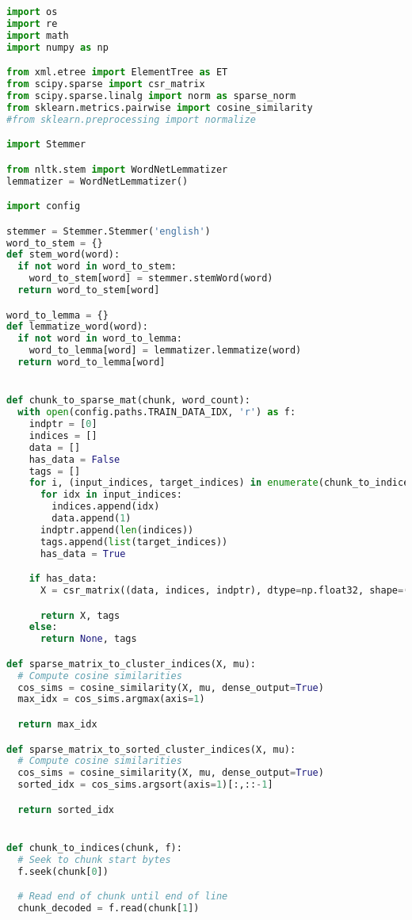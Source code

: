 \begin{lstlisting}[language=python]
import os
import re
import math
import numpy as np

from xml.etree import ElementTree as ET
from scipy.sparse import csr_matrix
from scipy.sparse.linalg import norm as sparse_norm
from sklearn.metrics.pairwise import cosine_similarity
#from sklearn.preprocessing import normalize

import Stemmer

from nltk.stem import WordNetLemmatizer
lemmatizer = WordNetLemmatizer()

import config

stemmer = Stemmer.Stemmer('english')
word_to_stem = {}
def stem_word(word):
  if not word in word_to_stem:
    word_to_stem[word] = stemmer.stemWord(word)
  return word_to_stem[word]

word_to_lemma = {}
def lemmatize_word(word):
  if not word in word_to_lemma:
    word_to_lemma[word] = lemmatizer.lemmatize(word)
  return word_to_lemma[word]


def chunk_to_sparse_mat(chunk, word_count):
  with open(config.paths.TRAIN_DATA_IDX, 'r') as f:
    indptr = [0]
    indices = []
    data = []
    has_data = False
    tags = []
    for i, (input_indices, target_indices) in enumerate(chunk_to_indices(chunk, f)):
      for idx in input_indices:
        indices.append(idx)
        data.append(1)
      indptr.append(len(indices))
      tags.append(list(target_indices))
      has_data = True

    if has_data:
      X = csr_matrix((data, indices, indptr), dtype=np.float32, shape=(len(indptr) - 1, word_count))

      return X, tags
    else:
      return None, tags

def sparse_matrix_to_cluster_indices(X, mu):
  # Compute cosine similarities
  cos_sims = cosine_similarity(X, mu, dense_output=True)
  max_idx = cos_sims.argmax(axis=1)

  return max_idx

def sparse_matrix_to_sorted_cluster_indices(X, mu):
  # Compute cosine similarities
  cos_sims = cosine_similarity(X, mu, dense_output=True)
  sorted_idx = cos_sims.argsort(axis=1)[:,::-1]

  return sorted_idx


def chunk_to_indices(chunk, f):
  # Seek to chunk start bytes
  f.seek(chunk[0])

  # Read end of chunk until end of line
  chunk_decoded = f.read(chunk[1])


\end{lstlisting}
